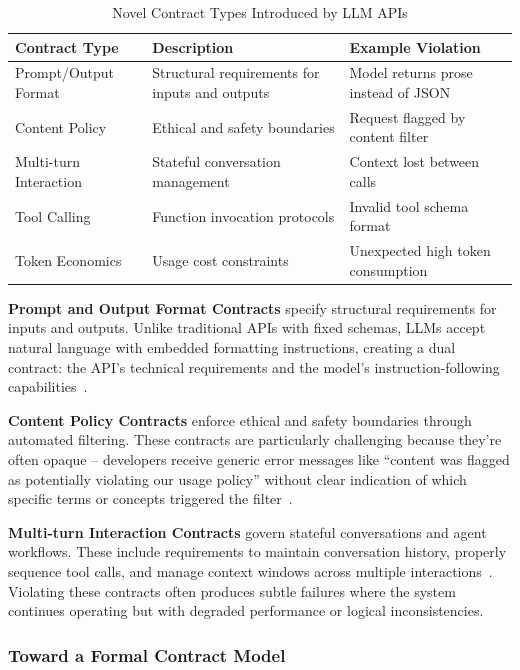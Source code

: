 \documentclass[11pt]{article}
\begin{document}
\begin{table}[h]
\centering
\caption{Novel Contract Types Introduced by LLM APIs}
\label{tab:novel_contracts}
\begin{tabular}{p{3.5cm}p{6cm}p{5cm}}
\toprule
\textbf{Contract Type} & \textbf{Description} & \textbf{Example Violation} \\
\midrule
Prompt/Output Format & Structural requirements for inputs and outputs & Model returns prose instead of JSON~\cite{stackoverflow77944251} \\
Content Policy & Ethical and safety boundaries & Request flagged by content filter~\cite{githubopenai331} \\
Multi-turn Interaction & Stateful conversation management & Context lost between calls~\cite{githublangchain10316} \\
Tool Calling & Function invocation protocols & Invalid tool schema format~\cite{githubopenai1795} \\
Token Economics & Usage cost constraints & Unexpected high token consumption \\
\bottomrule
\end{tabular}
\end{table}

\textbf{Prompt and Output Format Contracts} specify structural requirements for inputs and outputs. Unlike traditional APIs with fixed schemas, LLMs accept natural language with embedded formatting instructions, creating a dual contract: the API's technical requirements and the model's instruction-following capabilities~\cite{guardrails2023}.

\textbf{Content Policy Contracts} enforce ethical and safety boundaries through automated filtering. These contracts are particularly challenging because they're often opaque -- developers receive generic error messages like ``content was flagged as potentially violating our usage policy'' without clear indication of which specific terms or concepts triggered the filter~\cite{openai2023moderation}.

\textbf{Multi-turn Interaction Contracts} govern stateful conversations and agent workflows. These include requirements to maintain conversation history, properly sequence tool calls, and manage context windows across multiple interactions~\cite{guidance2023}. Violating these contracts often produces subtle failures where the system continues operating but with degraded performance or logical inconsistencies.

\subsubsection{Toward a Formal Contract Model}
\end{document}

